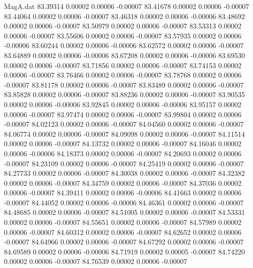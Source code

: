 \begin{filecontents}{MagA.dat}
  83.39314    0.00002    0.00006   -0.00007
  83.41678    0.00002    0.00006   -0.00007
  83.44064    0.00002    0.00006   -0.00007
  83.46318    0.00002    0.00006   -0.00006
  83.48692    0.00002    0.00006   -0.00007
  83.50979    0.00002    0.00006   -0.00007
  83.53313    0.00002    0.00006   -0.00007
  83.55606    0.00002    0.00006   -0.00007
  83.57935    0.00002    0.00006   -0.00006
  83.60244    0.00002    0.00006   -0.00006
  83.62572    0.00002    0.00006   -0.00007
  83.64889    0.00002    0.00006   -0.00006
  83.67208    0.00002    0.00006   -0.00006
  83.69530    0.00002    0.00006   -0.00007
  83.71856    0.00002    0.00006   -0.00007
  83.74153    0.00002    0.00006   -0.00007
  83.76466    0.00002    0.00006   -0.00007
  83.78768    0.00002    0.00006   -0.00007
  83.81178    0.00002    0.00006   -0.00007
  83.83489    0.00002    0.00006   -0.00007
  83.85828    0.00002    0.00006   -0.00007
  83.88236    0.00002    0.00006   -0.00007
  83.90535    0.00002    0.00006   -0.00006
  83.92845    0.00002    0.00006   -0.00006
  83.95157    0.00002    0.00006   -0.00007
  83.97474    0.00002    0.00006   -0.00007
  83.99804    0.00002    0.00006   -0.00007
  84.02123    0.00002    0.00006   -0.00007
  84.04560    0.00002    0.00006   -0.00007
  84.06774    0.00002    0.00006   -0.00007
  84.09098    0.00002    0.00006   -0.00007
  84.11514    0.00002    0.00006   -0.00007
  84.13732    0.00002    0.00006   -0.00007
  84.16046    0.00002    0.00006   -0.00006
  84.18373    0.00002    0.00006   -0.00007
  84.20693    0.00002    0.00006   -0.00007
  84.23109    0.00002    0.00006   -0.00007
  84.25419    0.00002    0.00006   -0.00007
  84.27733    0.00002    0.00006   -0.00007
  84.30038    0.00002    0.00006   -0.00007
  84.32382    0.00002    0.00006   -0.00007
  84.34759    0.00002    0.00006   -0.00007
  84.37036    0.00002    0.00006   -0.00007
  84.39411    0.00002    0.00006   -0.00006
  84.41663    0.00002    0.00006   -0.00007
  84.44052    0.00002    0.00006   -0.00006
  84.46361    0.00002    0.00006   -0.00007
  84.48685    0.00002    0.00006   -0.00007
  84.51005    0.00002    0.00006   -0.00007
  84.53331    0.00002    0.00006   -0.00007
  84.55651    0.00002    0.00006   -0.00007
  84.57989    0.00002    0.00006   -0.00007
  84.60312    0.00002    0.00006   -0.00007
  84.62652    0.00002    0.00006   -0.00007
  84.64966    0.00002    0.00006   -0.00007
  84.67292    0.00002    0.00006   -0.00007
  84.69589    0.00002    0.00006   -0.00006
  84.71919    0.00002    0.00005   -0.00007
  84.74220    0.00002    0.00006   -0.00007
  84.76539    0.00002    0.00006   -0.00007

\end{filecontents}
